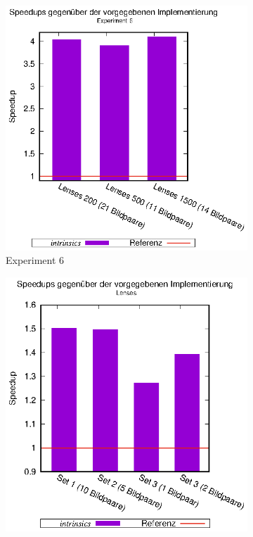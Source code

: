 \begin{center}
	\begin{figure}[htbp]
		\begin{subfigure}[b]{0.54\textwidth}
			\centering
			\includegraphics[width=\textwidth]{pdf/speedups_intrinsics_exp6}
			\caption{Experiment 6}
			\label{fig:speedups_intrinsics_exp6}
		\end{subfigure}
		\hspace{-0.9cm}
		\begin{subfigure}[b]{0.54\textwidth}
			\centering
			\includegraphics[width=\textwidth]{pdf/speedups_intrinsics_lenses}

\end{subfigure}
\end{figure}
\end{center}
